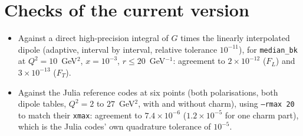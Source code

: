 \documentclass[11pt,a4paper]{article}
\newcommand{\code}[1]{\texttt{\small #1}}
\begin{document}
\section{Checks of the current version}
\begin{itemize}
\item Against a direct high-precision integral of $G$ times the linearly interpolated dipole (adaptive, interval by interval, relative tolerance $10^{-11}$), for \code{median\_bk} at $Q^2=10$~GeV$^2$, $x=10^{-3}$, $r\le20$~GeV$^{-1}$: agreement to $2\times10^{-12}$ ($F_L$) and $3\times10^{-13}$ ($F_T$).
\item Against the Julia reference codes at six points (both polarisations, both dipole tables, $Q^2=2$ to $27$~GeV$^2$, with and without charm), using \code{--rmax 20} to match their \code{xmax}: agreement to $7.4\times10^{-6}$ ($1.2\times10^{-5}$ for one charm part), which is the Julia codes' own quadrature tolerance of $10^{-5}$.
\end{itemize}
\end{document}

